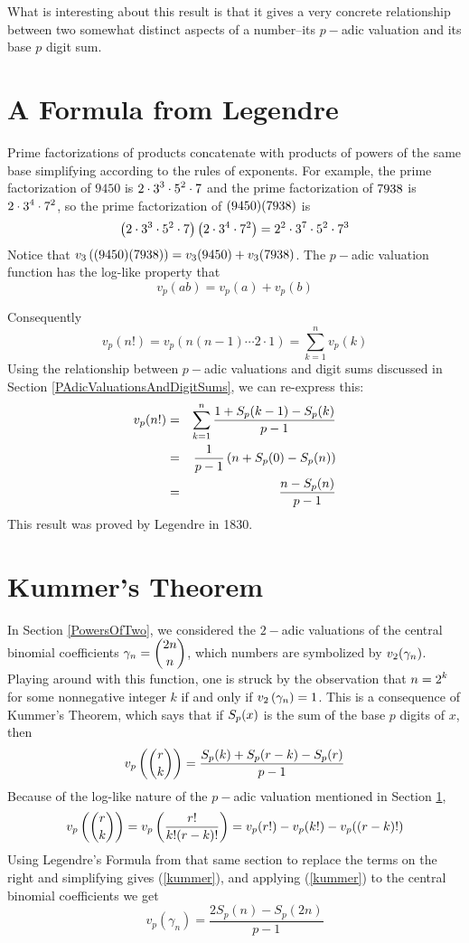 What is interesting about this result is that it gives a very concrete relationship between two somewhat distinct aspects of a number--its $p-$adic valuation and its base $p$ digit sum.


\iffalse
\section{A Formula from Legendre}
\label{AFormulaFromLegendre}

Prime factorizations of products concatenate with products of powers of the same base simplifying according to the rules of exponents. For example, the prime factorization of $9450$ is $\displaystyle 2\cdot 3^3 \cdot 5^2\cdot 7$ and the prime factorization of $\displaystyle 7938$ is $\displaystyle 2\cdot 3^4\cdot 7^2$, so the prime factorization of $\displaystyle (9450)(7938)$ is 
\[
  \left( 2\cdot 3^3 \cdot 5^2\cdot 7 \right) \left( 2\cdot 3^4\cdot 7^2 \right) = 2^2 \cdot 3^7\cdot 5^2\cdot 7^3
\]
Notice that $\displaystyle v_3\left( (9450)(7938) \right) = v_3(9450) + v_3(7938)$. The $p-$adic valuation function has the log-like property that 
\[
  v_p(ab) = v_p(a) + v_p(b)
\]

Consequently
\[
  v_p(n!) = v_p(n(n-1)\cdots 2\cdot 1) = \sum_{k=1}^n v_p(k)
\]
Using the relationship between $p-$adic valuations and digit sums discussed in Section \ref{PAdicValuationsAndDigitSums}, we can re-express this:
\begin{eqnarray*}
  v_p(n!) & = & \sum_{k=1}^n \frac{1 + S_p(k-1) - S_p(k)}{p-1} \\
  & = & \frac{1}{p-1}\left( n + S_p(0) - S_p(n) \right) \\
  & = & \frac{n - S_p(n)}{p-1}
\end{eqnarray*}
This result was proved by Legendre in 1830.

\section*{Kummer's Theorem}
\label{KummersTheorem}

In Section \ref{PowersOfTwo}, we considered the $2-$adic valuations of the central binomial coefficients $\displaystyle \gamma_n = \binom{2n}{n}$, which numbers are symbolized by $\displaystyle v_2(\gamma_n)$. Playing around with this function, one is struck by the observation that $\displaystyle n = 2^k$ for some nonnegative integer $k$ if and only if $\displaystyle v_2\left( \gamma_n \right) = 1$. This is a consequence of Kummer's Theorem, which says that if $\displaystyle S_p(x)$ is the sum of the base $p$ digits of $x$, then
\begin{equation} \label{kummer}
  v_p\left( \binom{r}{k}\right) = \frac{S_p(k) + S_p(r-k) - S_p(r)}{p-1}
\end{equation}
Because of the log-like nature of the $p-$adic valuation mentioned in Section \ref{AFormulaFromLegendre}, 
\[
  v_p\left( \binom{r}{k}\right) = v_p \left( \frac{r!}{k!(r-k)!} \right) = v_p(r!) - v_p(k!) - v_p((r-k)!)
\]
Using Legendre's Formula from that same section to replace the terms on the right and simplifying gives (\ref{kummer}), and applying (\ref{kummer}) to the central binomial coefficients we get 
\begin{equation} \label{VpOfGamman}
  v_p(\gamma_n) = \frac{2 S_p(n) - S_p(2n)}{p-1}
\end{equation}

